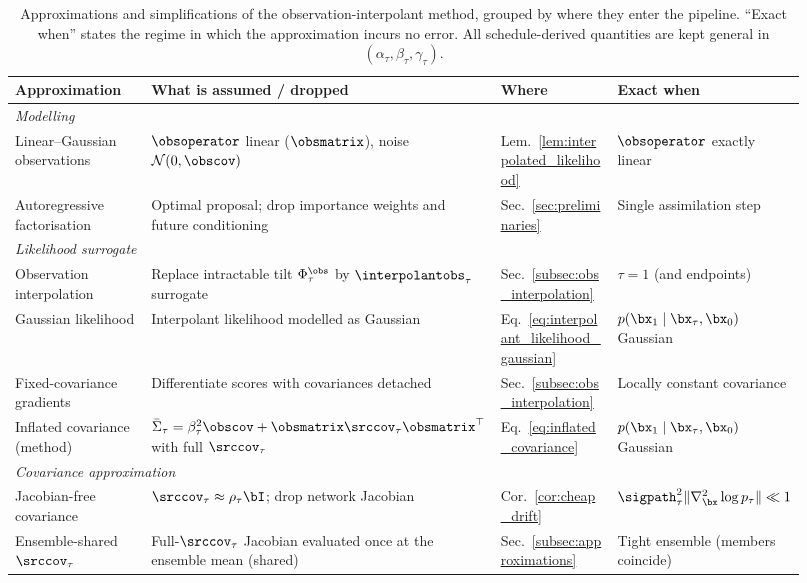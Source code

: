 \begin{table}[ht]
    \centering
    \caption{Approximations and simplifications of the observation-interpolant
    method, grouped by where they enter the pipeline. ``Exact when'' states the
    regime in which the approximation incurs no error. All schedule-derived
    quantities are kept general in $(\alpha_\tau,\beta_\tau,\gamma_\tau)$.}
    \label{tab:approximations}
    \small
    \begin{tabular}{p{0.21\linewidth} p{0.30\linewidth} p{0.20\linewidth} p{0.21\linewidth}}
        \toprule
        \textbf{Approximation} & \textbf{What is assumed / dropped} & \textbf{Where} & \textbf{Exact when} \\
        \midrule
        \multicolumn{4}{l}{\emph{Modelling}}\\
        Linear--Gaussian observations & $\obsoperator$ linear ($\obsmatrix$), noise $\mathcal N(0,\obscov)$ & Lem.~\ref{lem:interpolated_likelihood} & $\obsoperator$ exactly linear \\
        Autoregressive factorisation & Optimal proposal; drop importance weights and future conditioning & Sec.~\ref{sec:preliminaries} & Single assimilation step \\
        \midrule
        \multicolumn{4}{l}{\emph{Likelihood surrogate}}\\
        Observation interpolation & Replace intractable tilt $\Phi_\tau^{\obs}$ by $\interpolantobs_\tau$ surrogate & Sec.~\ref{subsec:obs_interpolation} & $\tau=1$ (and endpoints) \\
        Gaussian likelihood & Interpolant likelihood modelled as Gaussian & Eq.~\eqref{eq:interpolant_likelihood_gaussian} & $p(\bx_1\mid\bx_\tau,\bx_0)$ Gaussian \\
        Fixed-covariance gradients & Differentiate scores with covariances detached & Sec.~\ref{subsec:obs_interpolation} & Locally constant covariance \\
        Inflated covariance (method) & $\bar\Sigma_\tau=\beta_\tau^2\obscov+\obsmatrix\srccov_\tau\obsmatrix^\top$ with full $\srccov_\tau$ & Eq.~\eqref{eq:inflated_covariance} & $p(\bx_1\mid\bx_\tau,\bx_0)$ Gaussian \\
        \midrule
        \multicolumn{4}{l}{\emph{Covariance approximation}}\\
        Jacobian-free covariance & $\srccov_\tau\approx\rho_\tau\bI$; drop network Jacobian & Cor.~\ref{cor:cheap_drift} & $\sigpath_\tau^2\|\nabla^2_{\bx}\log p_\tau\|\ll1$ \\
        Ensemble-shared $\srccov_\tau$ & Full-$\srccov_\tau$ Jacobian evaluated once at the ensemble mean (shared) & Sec.~\ref{subsec:approximations} & Tight ensemble (members coincide) \\

\end{tabular}
\end{table}
